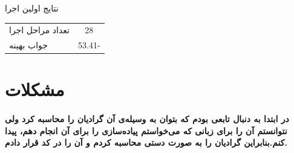 \documentclass[paper=a4, fontsize=11pt]{article}
\numberwithin{equation}{section} %
\numberwithin{figure}{section} %
\numberwithin{table}{section} %
\begin{document}
\begin{center}
	نتایج اولین اجرا\\
	\begin{tabular}{| l | c |}
		\hline
		تعداد مراحل اجرا & 28 \\
		جواب بهینه & 53.41- \\
		\hline
	\end{tabular}
\end{center}

\section{مشکلات}
\paragraph{
	در ابتدا به دنبال تابعی بودم که بتوان به وسیله‌ی آن گرادیان را محاسبه کرد ولی نتوانستم آن را برای زبانی
	که می‌خواستم پیاده‌سازی را برای آن انجام دهم، پیدا کنم.بنابراین گرادیان را به صورت دستی محاسبه کردم و آن را در کد قرار دادم.
}
\end{document}
